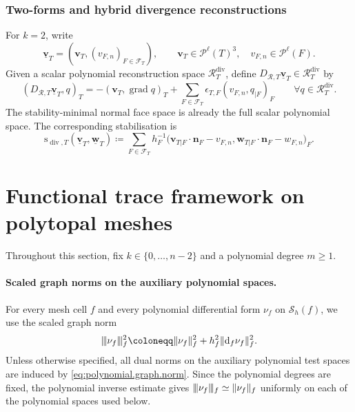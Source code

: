 \documentclass[a4paper,11pt]{article}
\theoremstyle{definition}
\newcommand{\DIFF}{\mathrm{d}}
\newcommand{\Sh}{\mathcal{S}_h}
\newcommand{\epsTF}{\epsilon_{T,F}}
\newcommand{\vvvert}{\vert\kern-0.25ex\vert\kern-0.25ex\vert}
\begin{document}
\subsubsection{Two-forms and hybrid divergence reconstructions}
\label{subsec:proxy.divergence}

For $k=2$, write
\[
  \underline{\boldsymbol v}_T
  =
  (\boldsymbol v_T,(v_{F,n})_{F\in\mathcal F_T}),
  \qquad
  \boldsymbol v_T\in\mathcal P^\ell(T)^3,
  \quad
  v_{F,n}\in\mathcal P^\ell(F).
\]
Given a scalar polynomial reconstruction space $\mathcal R_T^{\mathrm{div}}$, define $D_{\mathcal R,T}\underline{\boldsymbol v}_T \in \mathcal R_T^{\mathrm{div}}$ by
\[
  (D_{\mathcal R,T}\underline{\boldsymbol v}_T,q)_T
  =
  -(\boldsymbol v_T,\operatorname{grad}q)_T
  +
  \sum_{F\in\mathcal F_T}
  \epsTF
  (v_{F,n},q_{|F})_F
  \qquad
  \forall q\in\mathcal R_T^{\mathrm{div}}.
\]
The stability-minimal normal face space is already the full scalar polynomial space.
The corresponding stabilisation is
\[
  \mathrm s_{\operatorname{div},T}
  (\underline{\boldsymbol v}_T,
   \underline{\boldsymbol w}_T)
  \coloneqq
  \sum_{F\in\mathcal F_T}
  h_F^{-1}
  \bigl(
    \boldsymbol v_{T|F}\cdot\boldsymbol n_F-v_{F,n},
    \boldsymbol w_{T|F}\cdot\boldsymbol n_F-w_{F,n}
  \bigr)_F.
\]

\section{Functional trace framework on polytopal meshes}
\label{sec:functional.framework}

Throughout this section, fix $k\in\{0,\ldots,n-2\}$ and a polynomial degree $m\geq1$.

\paragraph{Scaled graph norms on the auxiliary polynomial spaces.}

For every mesh cell $f$ and every polynomial differential form $\nu_f$ on $\Sh(f)$, we use the scaled graph norm
\begin{equation}\label{eq:polynomial.graph.norm}
  \vvvert\nu_f\vvvert_f^2
  \coloneqq
  \|\nu_f\|_f^2
  +
  h_f^2\|\DIFF_f\nu_f\|_f^2.
\end{equation}
Unless otherwise specified, all dual norms on the auxiliary polynomial test spaces are induced by \eqref{eq:polynomial.graph.norm}.
Since the polynomial degrees are fixed, the polynomial inverse estimate gives $\vvvert\nu_f\vvvert_f \simeq \|\nu_f\|_f$ uniformly on each of the polynomial spaces used below.
\end{document}
